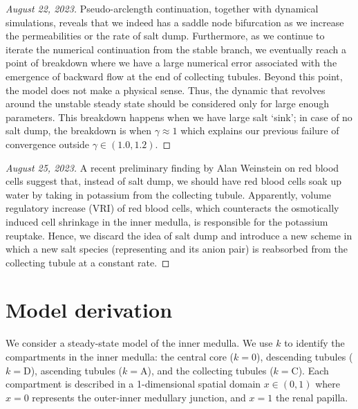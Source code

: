 \documentclass{article}
\numberwithin{equation}{section} %
\begin{document}
\begin{proof}[August 22, 2023]
    Pseudo-arclength continuation, together with dynamical simulations, reveals that we indeed has a saddle node bifurcation as we increase the permeabilities or the rate of salt dump.
    Furthermore, as we continue to iterate the numerical continuation from the stable branch, we eventually reach a point of breakdown where we have a large numerical error associated with the emergence of backward flow at the end of collecting tubules.
    Beyond this point, the model does not make a physical sense.
    Thus, the dynamic that revolves around the unstable steady state should be considered only for large enough parameters.
    This breakdown happens when we have large salt `sink'; in case of no salt dump, the breakdown is when $\gamma\approx 1$ which explains our previous failure of convergence outside $\gamma\in(1.0,1.2)$.
\end{proof}

\begin{proof}[August 25, 2023]
    A recent preliminary finding by Alan Weinstein on red blood cells suggest that, instead of salt dump, we should have red blood cells soak up water by taking in potassium from the collecting tubule.
    Apparently, volume regulatory increase (VRI) of red blood cells, which counteracts the osmotically induced cell shrinkage in the inner medulla, is responsible for the potassium reuptake.
    Hence, we discard the idea of salt dump and introduce a new scheme in which a new salt species (representing  and its anion pair) is reabsorbed from the collecting tubule at a constant rate.
\end{proof}

\section{Model derivation}


We consider a steady-state model of the inner medulla.
We use $k$ to identify the compartments in the inner medulla: the central core ($k=0$), descending tubules ($k=\mathrm{D}$), ascending tubules ($k=\mathrm{A}$), and the collecting tubules ($k=\mathrm{C}$).
Each compartment is described in a 1-dimensional spatial domain $x\in (0,1)$ where $x=0$ represents the outer-inner medullary junction, and $x=1$ the renal papilla.
\end{document}
